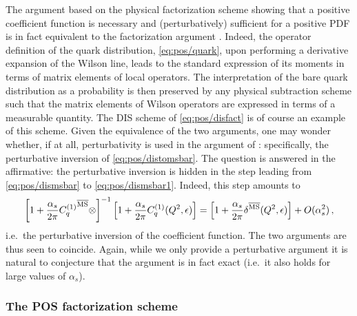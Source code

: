 The argument based on the physical factorization scheme showing that
a positive coefficient function is necessary and (perturbatively)
sufficient for a positive PDF is in fact equivalent to the
factorization argument
. Indeed, 
the operator definition of the quark distribution, \cref{eq:pos/quark},
upon performing a derivative expansion of the Wilson line, leads to
the standard expression of its moments in terms of matrix elements of
local operators. The interpretation of the bare quark distribution as
a probability  is then
preserved by any physical subtraction scheme such that the matrix
elements of Wilson operators are expressed in terms of a measurable
quantity. The DIS scheme of \cref{eq:pos/disfact} is of course an
example of this scheme. Given the equivalence of the two arguments,
one may wonder whether, if at all, perturbativity is used in the
argument of : specifically,
the perturbative inversion of \cref{eq:pos/distomsbar}. The question is
answered in the affirmative: the perturbative inversion is hidden in the step leading from \cref{eq:pos/dismsbar}
to \cref{eq:pos/dismsbar1}. Indeed, this step amounts to 
\begin{equation}\label{eq:pos/exinv}
\left[1
  +\frac{\alpha_s}{2\pi} {C_{q}^{(1)}}^{{\overline{\textrm{MS}}}}\otimes\right]^{-1} \left[1
    +\frac{\alpha_s}{2\pi} C_{q}^{(1)}(Q^2,\epsilon)\right]=
\left[1
    +\frac{\alpha_s}{2\pi} \delta^{{\overline{\textrm{MS}}}} (Q^2,\epsilon)\right]
+O(\alpha_s^2) \,,
\end{equation}
i.e.\ the perturbative inversion of the \msbar{} coefficient function. 
The two arguments are thus seen
to coincide. Again, while we only provide a perturbative argument it
is natural to conjecture that the argument is in fact exact (i.e.\ it
also holds for large values of $\alpha_s$).
 


\subsubsection{The POS factorization scheme}
\label{sec:pos}

